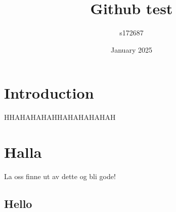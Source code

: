 \documentclass{article}
\title{Github test}
\author{s172687 }
\date{January 2025}
\begin{document}
\maketitle

\section{Introduction}
HHAHAHAHAHHAHAHAHAHAH
\section{Halla}
La oss finne ut av dette og bli gode!


\subsection{Hello}
\end{document}
